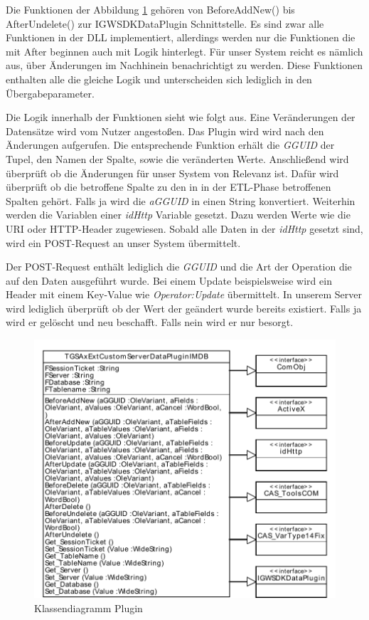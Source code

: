 Die Funktionen der Abbildung \ref{ergebniss_plugin_klassendiagramm} gehören von BeforeAddNew() bis AfterUndelete() zur IGWSDKDataPlugin Schnittstelle. Es sind zwar alle Funktionen in der DLL implementiert, allerdings werden nur die Funktionen die mit After beginnen auch mit Logik hinterlegt. Für unser System reicht es nämlich aus, über Änderungen im Nachhinein benachrichtigt zu werden. Diese Funktionen enthalten alle die gleiche Logik und unterscheiden sich lediglich in den Übergabeparameter.

Die Logik innerhalb der Funktionen sieht wie folgt aus. Eine Veränderungen der Datensätze wird vom Nutzer angestoßen. Das Plugin wird wird nach den Änderungen aufgerufen. Die entsprechende Funktion erhält die \textit{GGUID} der Tupel, den Namen der Spalte, sowie die veränderten Werte. Anschließend wird überprüft ob die Änderungen für unser System von Relevanz ist. Dafür wird überprüft ob die betroffene Spalte zu den in in der ETL-Phase betroffenen Spalten gehört. Falls ja wird die \textit{aGGUID} in einen String konvertiert. Weiterhin werden die Variablen einer \textit{idHttp} Variable gesetzt. Dazu werden Werte wie die URI oder HTTP-Header zugewiesen. Sobald alle Daten in der \textit{idHttp} gesetzt sind, wird ein POST-Request an unser System übermittelt. 

Der POST-Request enthält lediglich die \textit{GGUID} und die Art der Operation die auf den Daten ausgeführt wurde. Bei einem Update beispielsweise wird ein Header mit einem Key-Value wie \textit{Operator:Update} übermittelt. In unserem Server wird lediglich überprüft ob der Wert der geändert wurde bereits existiert. Falls ja wird er gelöscht und neu beschafft. Falls nein wird er nur besorgt.


\begin{figure}[htbp]
\centering
\includegraphics[scale=0.8]{pics/plugin_klassendiagramm.pdf}
\caption{Klassendiagramm Plugin}
\label{ergebniss_plugin_klassendiagramm}
\end{figure}

